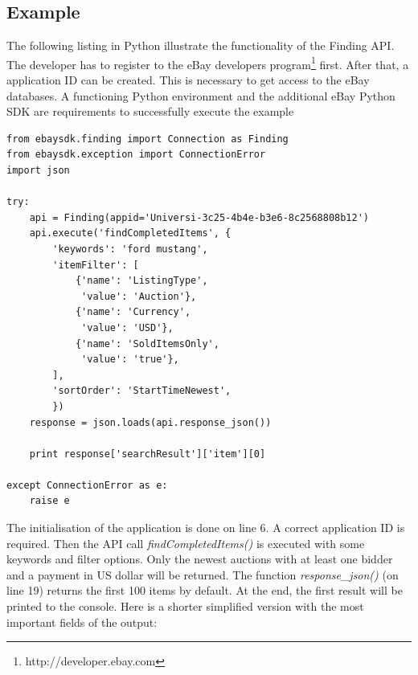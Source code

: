 \subsection{Example}
The following listing in Python illustrate the functionality of the Finding API. The developer has to register to the eBay developers program\footnote{http://developer.ebay.com} first. After that, a application ID can be created. This is necessary to get access to the eBay databases. A functioning Python environment and the additional eBay Python SDK are requirements to successfully execute the example
\begin{lstlisting}
from ebaysdk.finding import Connection as Finding
from ebaysdk.exception import ConnectionError
import json

try:
    api = Finding(appid='Universi-3c25-4b4e-b3e6-8c2568808b12')
    api.execute('findCompletedItems', {
        'keywords': 'ford mustang',
        'itemFilter': [
            {'name': 'ListingType',
             'value': 'Auction'},
            {'name': 'Currency',
             'value': 'USD'},                
            {'name': 'SoldItemsOnly',
             'value': 'true'},                 
        ],        
        'sortOrder': 'StartTimeNewest',
        })
    response = json.loads(api.response_json())
    
    print response['searchResult']['item'][0]
    
except ConnectionError as e:
    raise e  
\end{lstlisting}
The initialisation of the application is done on line 6. A correct application ID is required. Then the API call \textit{findCompletedItems()} is executed with some keywords and filter options. Only the newest auctions with at least one bidder and a payment in US dollar will be returned. The function \textit{response\_json()} (on line 19) returns the first 100 items by default. At the end, the first result will be printed to the console. Here is a shorter simplified version with the most important fields of the output:
